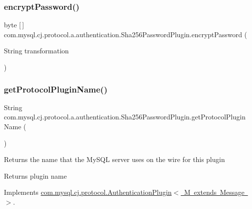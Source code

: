 \subsubsection{\texorpdfstring{encrypt\+Password()}{encryptPassword()}\hspace{0.1cm}{\footnotesize\ttfamily [2/2]}}
{\footnotesize\ttfamily byte \mbox{[}$\,$\mbox{]} com.\+mysql.\+cj.\+protocol.\+a.\+authentication.\+Sha256\+Password\+Plugin.\+encrypt\+Password (\begin{DoxyParamCaption}\item[{String}]{transformation }\end{DoxyParamCaption})\hspace{0.3cm}{\ttfamily [protected]}}

\mbox{\label{classcom_1_1mysql_1_1cj_1_1protocol_1_1a_1_1authentication_1_1_sha256_password_plugin_a37166ed37c83a82c995bee4f1edb43eb}} 
\subsubsection{\texorpdfstring{get\+Protocol\+Plugin\+Name()}{getProtocolPluginName()}}
{\footnotesize\ttfamily String com.\+mysql.\+cj.\+protocol.\+a.\+authentication.\+Sha256\+Password\+Plugin.\+get\+Protocol\+Plugin\+Name (\begin{DoxyParamCaption}{ }\end{DoxyParamCaption})}

Returns the name that the My\+S\+QL server uses on the wire for this plugin

\begin{DoxyReturn}{Returns}
plugin name 
\end{DoxyReturn}


Implements \mbox{\hyperlink{interfacecom_1_1mysql_1_1cj_1_1protocol_1_1_authentication_plugin_ab428486b799598c36f4506c95ff5b94b}{com.\+mysql.\+cj.\+protocol.\+Authentication\+Plugin$<$ M extends Message $>$}}.

